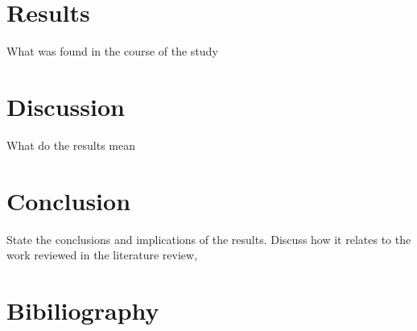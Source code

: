 \documentclass[a4paper, 11pt]{article}
\begin{document}
\section{Results}
What was found in the course of the study

\section{Discussion}
What do the results mean

\section{Conclusion}
State the conclusions and implications of the results. Discuss how it relates to the work reviewed in the literature review, 

\section{Bibiliography}
\end{document}
